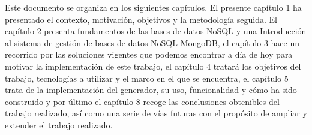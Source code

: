 Este documento se organiza en los siguientes capítulos. El presente capítulo 1 ha
presentado el contexto, motivación, objetivos y la metodología seguida. El capítulo 2 presenta fundamentos de las bases de datos NoSQL y una Introducción al sistema de gestión de bases de datos NoSQL MongoDB, el capítulo 3 hace un recorrido por las soluciones vigentes que podemos encontrar a día de hoy para motivar la implementación de este trabajo, el capítulo 4 tratará los objetivos del trabajo, tecnologías a utilizar y el marco en el que se encuentra, el capítulo 5 trata de la implementación del generador, su uso, funcionalidad y cómo ha sido construido y por último el capítulo 8 recoge las conclusiones obtenibles del trabajo realizado, así como una serie de vías futuras con el propósito de ampliar y extender el trabajo realizado.

